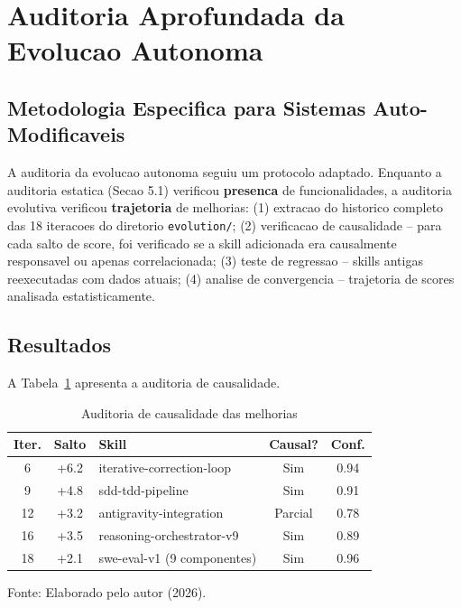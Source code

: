 \documentclass[12pt,a4paper,oneside,sumario=tradicional,chapter=TITLE,section=TITLE,subsection=TITLE,english,brazil]{abntex2}
\begin{document}
\section{Auditoria Aprofundada da Evolucao Autonoma}

\subsection{Metodologia Especifica para Sistemas Auto-Modificaveis}

A auditoria da evolucao autonoma seguiu um protocolo adaptado. Enquanto a auditoria estatica (Secao 5.1) verificou \textbf{presenca} de funcionalidades, a auditoria evolutiva verificou \textbf{trajetoria} de melhorias: (1) extracao do historico completo das 18 iteracoes do diretorio \texttt{evolution/}; (2) verificacao de causalidade -- para cada salto de score, foi verificado se a skill adicionada era causalmente responsavel ou apenas correlacionada; (3) teste de regressao -- skills antigas reexecutadas com dados atuais; (4) analise de convergencia -- trajetoria de scores analisada estatisticamente.

\subsection{Resultados}

A Tabela~\ref{tab:evo-audit} apresenta a auditoria de causalidade.

\begin{table}[H]\centering\caption{Auditoria de causalidade das melhorias}\label{tab:evo-audit}
\begin{tabular}{ccp{4.5cm}cc}\toprule\textbf{Iter.} & \textbf{Salto} & \textbf{Skill} & \textbf{Causal?} & \textbf{Conf.} \\\midrule
6 & +6.2 & iterative-correction-loop & Sim & 0.94 \\
9 & +4.8 & sdd-tdd-pipeline & Sim & 0.91 \\
12 & +3.2 & antigravity-integration & Parcial\footnotemark & 0.78 \\
16 & +3.5 & reasoning-orchestrator-v9 & Sim & 0.89 \\
18 & +2.1 & swe-eval-v1 (9 componentes) & Sim & 0.96 \\\bottomrule
\end{tabular}
\small\vspace{2pt}Fonte: Elaborado pelo autor (2026).\smallskip
\end{table}
\end{document}
